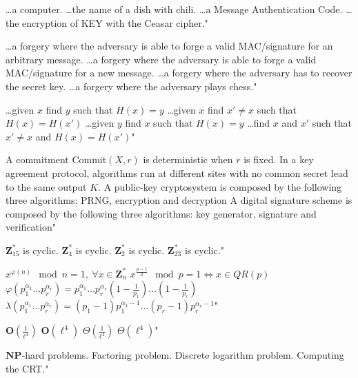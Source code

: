 {\ldots a computer.}
{\ldots the name of a dish with chili.}
{\ldots a Message Authentication Code.}
{\ldots the encryption of KEY with the Ceasar cipher."}

{\ldots a forgery where the adversary is able to forge a valid MAC/signature for an arbitrary message.}
{\ldots a forgery where the adversary is able to forge a valid MAC/signature for a new message.}
{\ldots a forgery where the adversary has to recover the secret key.}
{\ldots a forgery where the adversary plays chess."}

{\ldots given $x$ find $y$ such that $H(x)=y$}
{\ldots given $x$ find $x'\neq x$ such that $H(x)=H(x')$}
{\ldots given $y$ find $x$ such that $H(x)=y$}
{\ldots find $x$ and $x'$ such that $x'\neq x$ and $H(x)=H(x')$"}

{A commitment Commit$(X,r)$ is deterministic when $r$ is fixed.}
{In a key agreement protocol, algorithms run at different sites with no common secret lead to the same output $K$.}
{A public-key cryptosystem is composed by the following three algorithms: PRNG, encryption and decryption}
{A digital signature scheme is composed by the following three algorithms: key generator, signature and verification"}

{$\mathbf{Z}_{15}^*$ is cyclic.}
{$\mathbf{Z}_4^*$ is cyclic.}
{$\mathbf{Z}_2^*$ is cyclic.}
{$\mathbf{Z}_{23}^*$ is cyclic."}

{$x^{\varphi(n)}\mod n = 1,\ \forall x \in \mathbf{Z}_n^*$}
{$x^{\frac{p-1}{2}}\mod p = 1 \Leftrightarrow x\in QR(p)$}
{$\varphi(p_1^{\alpha_1}\ldots p_r^{\alpha_r})=p_1^{\alpha_1}\ldots p_r^{\alpha_r}(1-\frac{1}{p_1})\ldots(1-\frac{1}{p_r})$}
{$\lambda(p_1^{\alpha_1}\ldots p_r^{\alpha_r})=(p_1-1)p_1^{\alpha_1-1}\ldots(p_r-1)p_r^{\alpha_r-1}$"}

{$\mathbf{O}\left(\frac{1}{\ell^4}\right)$}
{$\mathbf{O}(\ell^4)$}
{$\Theta\left(\frac{1}{\ell^4}\right)$}
{$\Theta(\ell^4)$"}

{$\mathbf{NP}$-hard problems.}
{Factoring problem.}
{Discrete logarithm problem.}
{Computing the CRT."}

